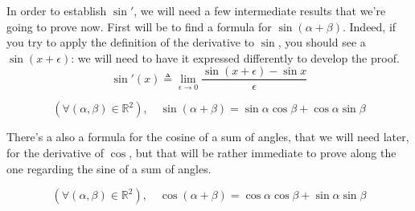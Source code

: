 \documentclass[solutions.tex]{subfiles}
\begin{document}
In order to establish $\sin'$, we will need a few intermediate
results that we're going to prove now. First will be to find a formula
for $\sin(\alpha+\beta)$. Indeed, if you try to apply the definition of the
derivative to $\sin$, you should see a $\sin(x+\epsilon)$: we will need
to have it expressed differently to develop the proof.
\[
	\sin'(x) \triangleq \lim_{\epsilon \rightarrow 0}
		\frac{\sin(x+\epsilon)-\sin x}{\epsilon}
\]

\begin{theorem}[$\sin(\alpha+\beta)$]
\begin{equation}
	(\forall(\alpha, \beta)\in\mathbb{R}^2),\quad
		\boxed{\sin(\alpha+\beta) = \sin\alpha\cos\beta +\cos\alpha\sin\beta}
	\label{L02E05:thm:sinsum}
\end{equation}
\end{theorem}
There's a also a formula for the cosine of a sum of angles, that we will
need later, for the derivative of $\cos$, but that will be rather immediate
to prove along the one regarding the sine of a sum of angles.
\begin{theorem}[$\cos(\alpha+\beta)$]
\begin{equation}
	(\forall(\alpha, \beta)\in\mathbb{R}^2),\quad
		\boxed{\cos(\alpha+\beta) = \cos\alpha\cos\beta +\sin\alpha\sin\beta}
	\label{L02E05:thm:cossum}
\end{equation}
\end{theorem}
\end{document}

